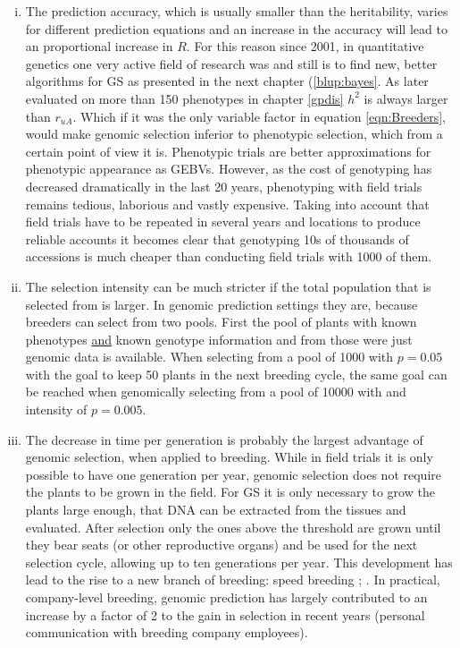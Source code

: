 \begin{enumerate}[(i)]
\item The prediction accuracy, which is usually smaller than the heritability, varies for
  different prediction equations and an increase in the accuracy will lead to an
  proportional increase in $R$. For this reason since 2001, in quantitative genetics one
  very active field of research was and still is to find new, better algorithms for GS as
  presented in the next chapter (\ref{blup:bayes}. As later evaluated on more than 150
  phenotypes in chapter \ref{gpdis} $h^2$ is always larger than $r_{uA}$. Which if it was
  the only variable factor in equation \ref{eqn:Breeders}, would make genomic selection
  inferior to phenotypic selection, which from a certain point of view it is. Phenotypic
  trials are better approximations for phenotypic appearance as GEBVs. However, as the
  cost of genotyping has decreased dramatically in the last 20 years, phenotyping with
  field trials remains tedious, laborious and vastly expensive. Taking into account
  that field trials have to be repeated in several years and locations to produce reliable
  accounts it becomes clear that genotyping 10s of thousands of accessions is much
  cheaper than conducting field trials with 1000 of them.
\item The selection intensity can be much stricter if the total population that is
  selected from is larger. In genomic prediction settings they are, because breeders can
  select from two pools. First the pool of plants with known phenotypes \underline{and}
  known genotype information and from those were just genomic data is available. When
  selecting from a pool of 1000 with $p=0.05$ with the goal to keep 50 plants in the next
  breeding cycle, the same goal can be reached when genomically selecting from a pool of
  10000 with and intensity of $p=0.005$.
\item The decrease in time per generation is probably the largest advantage of genomic
  selection, when applied to breeding. While in field trials it is only possible to have
  one generation per year, genomic selection does not require the plants to be grown in
  the field. For GS it is only necessary to grow the plants large enough, that DNA can be
  extracted from the tissues and evaluated. After selection only the ones above the
  threshold are grown until they bear seats (or other reproductive organs) and be used for
  the next selection cycle, allowing up to ten generations per year. This development has
  lead to the rise to a new branch of breeding: speed breeding \cite{ghosh2018speed};
  \cite{watson2018speed}. In practical, company-level breeding, genomic prediction has
  largely contributed to an increase by a factor of 2 to the gain in selection in recent
  years (personal communication with breeding company employees).
\end{enumerate}

